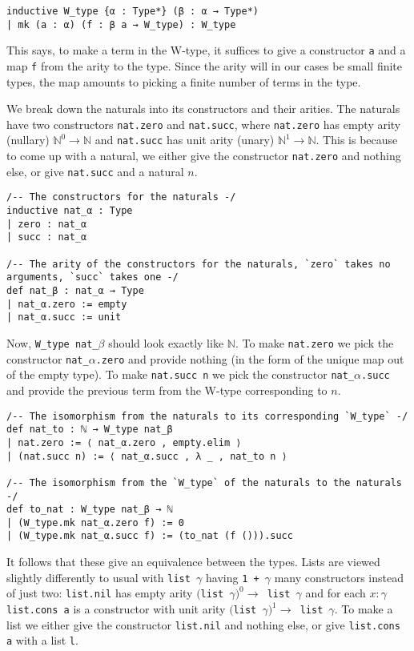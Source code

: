\documentclass{article}
\newcommand{\al}{\alpha}
\newcommand{\be}{\beta}
\newcommand{\ga}{\gamma}
\newcommand{\N}{\mathbb{N}}
\newcommand{\<}{\langle}
\renewcommand{\>}{\rangle}
\theoremstyle{definitionstyle}
\theoremstyle{exercisestyle}
\theoremstyle{remarkstyle}
\begin{document}
\begin{lstlisting}
inductive W_type {α : Type*} (β : α → Type*)
| mk (a : α) (f : β a → W_type) : W_type \end{lstlisting}

This says, to make a term in the W-type, it suffices to
give a constructor \texttt{a} and a map \texttt{f} from the arity to the type.
Since the arity will in our cases be small finite types,
the map amounts to picking a finite number of terms in the type.

We break down the naturals into its constructors and their arities.
The naturals have two constructors \texttt{nat.zero} and \texttt{nat.succ},
where \texttt{nat.zero} has empty arity (nullary) $\N^{0} \to \N$
and \texttt{nat.succ} has unit arity (unary) $\N^{1} \to \N$.
This is because to come up with a natural, we either give the
constructor \texttt{nat.zero} and nothing else, or give \texttt{nat.succ}
and a natural $n$.

\begin{lstlisting}
/-- The constructors for the naturals -/
inductive nat_α : Type
| zero : nat_α
| succ : nat_α

/-- The arity of the constructors for the naturals, `zero` takes no arguments, `succ` takes one -/
def nat_β : nat_α → Type
| nat_α.zero := empty
| nat_α.succ := unit\end{lstlisting}

Now, \texttt{W\_type nat\_$\be$} should look exactly like $\N$.
To make \texttt{nat.zero} we pick the constructor \texttt{nat\_$\al$.zero}
and provide nothing (in the form of the unique map out of the empty type).
To make \texttt{nat.succ n} we pick the constructor \texttt{nat\_$\al$.succ}
and provide the previous term from the W-type corresponding to $n$.

\begin{lstlisting}
/-- The isomorphism from the naturals to its corresponding `W_type` -/
def nat_to : ℕ → W_type nat_β
| nat.zero := ⟨ nat_α.zero , empty.elim ⟩
| (nat.succ n) := ⟨ nat_α.succ , λ _ , nat_to n ⟩

/-- The isomorphism from the `W_type` of the naturals to the naturals -/
def to_nat : W_type nat_β → ℕ
| (W_type.mk nat_α.zero f) := 0
| (W_type.mk nat_α.succ f) := (to_nat (f ())).succ \end{lstlisting}

It follows that these give an equivalence between the types.
Lists are viewed slightly differently to usual with \texttt{list $\ga$}
having \texttt{1 + $\ga$} many constructors instead of just two:
\texttt{list.nil} has empty arity
\texttt{$($list $\ga)^{0} \to $ list $\ga$}
and for each $x : \ga$
\texttt{list.cons a} is a constructor with unit arity
\texttt{$($list $\ga)^{1} \to $ list $\ga$}.
To make a list we either give the constructor \texttt{list.nil} and nothing else,
or give \texttt{list.cons a} with a list \texttt{l}.
\end{document}
